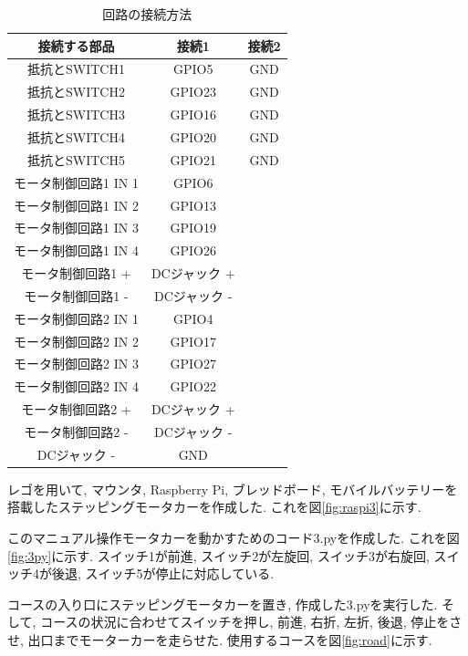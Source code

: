 \documentclass{ltjsarticle} %
\begin{document}
\begin{table}[H] %
  \centering %
  \caption{回路の接続方法}
  \begin{tabular}{|c|c|c|} 
  \hline %
  接続する部品 & 接続1 & 接続2 \\ \hline %
  抵抗とSWITCH1 & GPIO5 & GND \\ \hline
  抵抗とSWITCH2 & GPIO23 & GND \\ \hline
  抵抗とSWITCH3 & GPIO16 & GND \\ \hline
  抵抗とSWITCH4 & GPIO20 & GND \\ \hline
  抵抗とSWITCH5 & GPIO21 & GND \\ \hline
  モータ制御回路1 IN 1 & GPIO6 &   \\ \hline
  モータ制御回路1 IN 2 & GPIO13 &  \\ \hline
  モータ制御回路1 IN 3 & GPIO19 &  \\ \hline
  モータ制御回路1 IN 4 & GPIO26 &  \\ \hline
  モータ制御回路1 + & DCジャック + & \\ \hline
  モータ制御回路1 - & DCジャック - & \\ \hline
  モータ制御回路2 IN 1 & GPIO4 &   \\ \hline
  モータ制御回路2 IN 2 & GPIO17 &  \\ \hline
  モータ制御回路2 IN 3 & GPIO27 &  \\ \hline
  モータ制御回路2 IN 4 & GPIO22 &  \\ \hline
  モータ制御回路2 + & DCジャック + & \\ \hline
  モータ制御回路2 - & DCジャック - & \\ \hline
  DCジャック -  & GND & \\ \hline

  \end{tabular}
  \label{tab:tab3} %
\end{table}

レゴを用いて, マウンタ, Raspberry Pi, ブレッドボード, モバイルバッテリーを搭載したステッピングモータカーを作成した. 
これを図\ref{fig:raspi3}に示す. 

このマニュアル操作モータカーを動かすためのコード3.pyを作成した. これを図\ref{fig:3py}に示す. 
スイッチ1が前進, スイッチ2が左旋回, スイッチ3が右旋回, スイッチ4が後退, スイッチ5が停止に対応している. 

コースの入り口にステッピングモータカーを置き, 作成した3.pyを実行した. 
そして, コースの状況に合わせてスイッチを押し, 前進, 右折, 左折, 後退, 停止をさせ, 出口までモーターカーを走らせた. 
使用するコースを図\ref{fig:road}に示す. 
\end{document}
